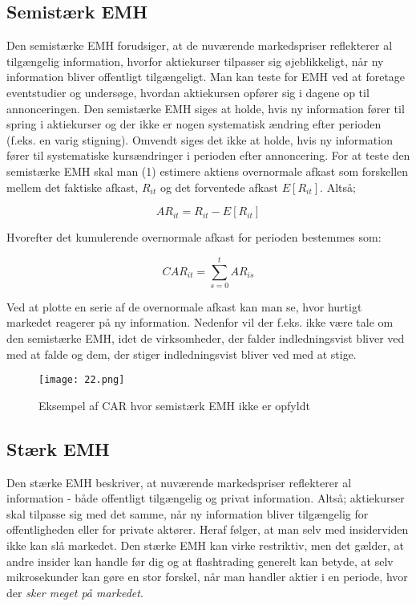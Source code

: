 \documentclass[10pt,reqno, usenames]{article}
\begin{document}
\subsection{Semistærk EMH}
Den semistærke EMH forudsiger, at de nuværende markedspriser reflekterer al tilgængelig information, hvorfor aktiekurser tilpasser sig øjeblikkeligt, når ny information bliver offentligt tilgængeligt. Man kan teste for EMH ved at foretage eventstudier og undersøge, hvordan aktiekursen opfører sig i dagene op til annonceringen. Den semistærke EMH siges at holde, hvis ny information fører til spring i aktiekurser og der ikke er nogen systematisk ændring efter perioden (f.eks. en varig stigning). Omvendt siges det ikke at holde, hvis ny  information fører til systematiske kursændringer i perioden efter annoncering. For at teste den semistærke EMH skal man (1) estimere aktiens overnormale afkast som forskellen mellem det faktiske afkast, $R_{it}$ og det forventede afkast $E[R_{it}]$. Altså; 

\begin{equation}
    AR_{it} = R_{it} - E[R_{it}]
\end{equation}

Hvorefter det kumulerende overnormale afkast for perioden bestemmes som: 

\begin{equation}
    CAR_{it} = \sum_{s=0}^{t} AR_{is}
\end{equation}

Ved at plotte en serie af de overnormale afkast kan man se, hvor hurtigt markedet reagerer på ny information. Nedenfor vil der f.eks. ikke være tale om den semistærke EMH, idet de virksomheder, der falder indledningsvist bliver ved med at falde og dem, der stiger indledningsvist bliver ved med at stige. 

\begin{figure}[h]
     \centering
     \texttt{[image: 22.png]}
     \caption{Eksempel af CAR hvor semistærk EMH ikke er opfyldt}
     \label{Figur 2}
\end{figure} 

\subsection{Stærk EMH}
Den stærke EMH beskriver, at nuværende markedspriser reflekterer al information - både offentligt tilgængelig og privat information. Altså; aktiekurser skal tilpasse sig med det samme, når ny information bliver tilgængelig for offentligheden eller for private aktører. Heraf følger, at man selv med insiderviden ikke kan slå markedet. Den stærke EMH kan virke restriktiv, men det gælder, at andre insider kan handle før dig og at flashtrading generelt kan betyde, at selv mikrosekunder kan gøre en stor forskel, når man handler aktier i en periode, hvor der \textit{sker meget på markedet}. 
\end{document}
